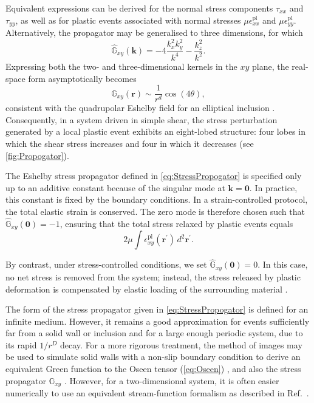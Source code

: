 Equivalent expressions can be derived for the normal stress components $\tau_{xx}$ and $\tau_{yy}$, as well as for plastic events associated with normal stresses $\mu \epsilon_{xx}^{\mathrm{pl}}$ and $\mu \epsilon_{yy}^{\mathrm{pl}}$. Alternatively, the propagator may be generalised to three dimensions, for which
\begin{equation}
\hat{\mathbb{G}}_{xy}(\bm{k}) = -4 \frac{k_x^2 k_y^2}{k^4} - \frac{k_z^2}{k^2}.
\end{equation}
Expressing both the two- and three-dimensional kernels in the $xy$ plane, the real-space form asymptotically becomes
\begin{equation}
\mathbb{G}_{xy}(\bm{r}) \sim \frac{1}{r^{d}} \cos(4\theta),
\label{eq:eshelbyReal}
\end{equation}
consistent with the quadrupolar Eshelby field for an elliptical inclusion \cite{eshelby_determination_1997}. Consequently, in a system driven in simple shear, the stress perturbation generated by a local plastic event exhibits an eight-lobed structure: four lobes in which the shear stress increases and four in which it decreases (see \cref{fig:Propogator}).

The Eshelby stress propagator defined in \cref{eq:StressPropogator} is specified only up to an additive constant because of the singular mode at $\bm{k}=\bm{0}$. In practice, this constant is fixed by the boundary conditions. In a strain-controlled protocol, the total elastic strain is conserved. The zero mode is therefore chosen such that $\hat{\mathbb{G}}_{xy}(\bm{0}) = -1$, ensuring that the total stress relaxed by plastic events equals
\[
    2\mu\int \epsilon_{xy}^{\mathrm{pl}}(\bm{r}^\prime) \, d^2\bm{r}^\prime.
\]

By contrast, under stress-controlled conditions, we set $\hat{\mathbb{G}}_{xy}(\bm{0}) = 0$. In this case, no net stress is removed from the system; instead, the stress released by plastic deformation is compensated by elastic loading of the surrounding material \cite{nicolas_deformation_2018,martens_spontaneous_2012,jocteur_protocol_2025,lin_scaling_2014}.

The form of the stress propagator given in \cref{eq:StressPropogator} is defined for an infinite medium. However, it remains a good approximation for events sufficiently far from a solid wall or inclusion and for a large enough periodic system, due to its rapid $1/r^{D}$ decay. For a more rigorous treatment, the method of images may be used to simulate solid walls with a non-slip boundary condition to derive an equivalent Green function to the Oseen tensor (\cref{eq:Oseen}) \cite{blake_note_1971}, and also the stress propagator $\mathbb{G}_{xy}$ \cite{picard_elastic_2004}. However, for a two-dimensional system, it is often easier numerically to use an equivalent stream-function formalism as described in Ref.~\cite{acheson_elementary_1990}.

